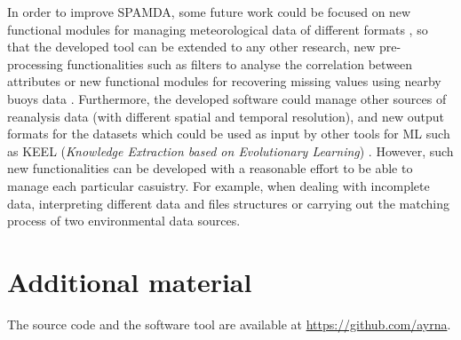 \documentclass[energies,article,submit,moreauthors,pdftex]{Definitions/mdpi}
\begin{document}
		In order to improve SPAMDA, some future work could be focused on new functional modules for managing meteorological data of different formats \cite{NOAA_3}, so that the developed tool can be extended to any other research, new pre-processing functionalities such as filters to analyse the correlation between attributes or new functional modules for recovering missing values using nearby buoys data \cite{DuranRosal2016}. Furthermore, the developed software could manage other sources of reanalysis data (with different spatial and temporal resolution), and new output formats for the datasets which could be used as input by other tools for ML such as KEEL (\textit{Knowledge Extraction based on Evolutionary Learning}) \cite{AlcalFdez2009KEELAS}. However, such new functionalities can be developed with a reasonable effort to be able to manage each particular casuistry. For example, when dealing with incomplete data, interpreting different data and files structures or carrying out the matching process of two environmental data sources.

    \section*{Additional material}
	
		The source code and the software tool are available at \url{https://github.com/ayrna}.

\vspace{6pt} 



\end{document}
